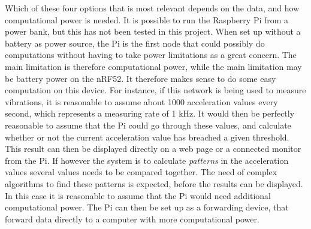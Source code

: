 Which of these four options that is most relevant depends on the data, and how computational power is needed. It is possible to run the Raspberry Pi from a power bank, but this has not been tested in this project. When set up without a battery as power source, the Pi is the first node that could possibly do computations without having to take power limitations as a great concern. The main limitation is therefore computational power, while the main limitation may be battery power on the nRF52. It therefore makes sense to do some easy computation on this device. For instance, if this network is being used to measure vibrations, it is reasonable to assume about 1000 acceleration values every second, which represents a measuring rate of 1 kHz. It would then be perfectly reasonable to assume that the Pi could go through these values, and calculate whether or not the current acceleration value has breached a given threshold. This result can then be displayed directly on a web page or a connected monitor from the Pi. If however the system is to calculate \textit{patterns} in the acceleration values several values needs to be compared together. The need of complex algorithms to find these patterns is expected, before the results can be displayed. In this case it is reasonable to assume that the Pi would need additional computational power. The Pi can then be set up as a forwarding device, that forward data directly to a computer with more computational power. 

